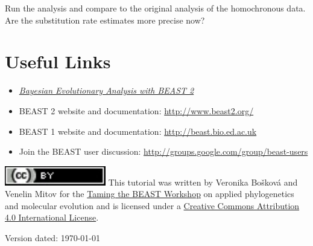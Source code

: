 \documentclass[11pt]{article}
\begin{document}
\newpage
Run the analysis and compare to the original analysis of the homochronous data. Are the substitution rate estimates more precise now?

\newpage
\bigskip
\section{Useful Links}

\begin{itemize}
\item \href{http://www.beast2.org/book.html}{\textit{Bayesian Evolutionary Analysis with BEAST 2}}  \citep{BEAST2book2014}\\ \vspace{-7mm}
\item BEAST 2 website and documentation: \href{http://www.beast2.org/}{http://www.beast2.org/} \\ \vspace{-7mm}
\item BEAST 1 website and documentation: \href{http://beast.bio.ed.ac.uk}{http://beast.bio.ed.ac.uk} \\ \vspace{-7mm}
\item Join the BEAST user discussion: \href{http://groups.google.com/group/beast-users}{http://groups.google.com/group/beast-users} \\ \vspace{-7mm}
\end{itemize}


\href{http://creativecommons.org/licenses/by/4.0/}{\includegraphics[scale=0.8]{figures/ccby.pdf}} This tutorial was written by %
{Veronika Bo\v{s}kov\'a and Venelin Mitov} for the \href{https://www.bsse.ethz.ch/cevo/taming-the-beast.html}{Taming the BEAST Workshop} on applied phylogenetics and molecular evolution and is licensed under a \href{http://creativecommons.org/licenses/by/4.0/}{Creative Commons Attribution 4.0 International License}. 



Version dated: \today
\end{document}
